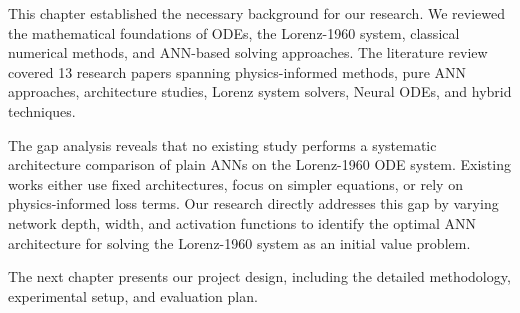 This chapter established the necessary background for our research. We reviewed the mathematical foundations of ODEs, the Lorenz-1960 system, classical numerical methods, and ANN-based solving approaches. The literature review covered 13 research papers spanning physics-informed methods, pure ANN approaches, architecture studies, Lorenz system solvers, Neural ODEs, and hybrid techniques.

The gap analysis reveals that no existing study performs a systematic architecture comparison of plain ANNs on the Lorenz-1960 ODE system. Existing works either use fixed architectures, focus on simpler equations, or rely on physics-informed loss terms. Our research directly addresses this gap by varying network depth, width, and activation functions to identify the optimal ANN architecture for solving the Lorenz-1960 system as an initial value problem.

The next chapter presents our project design, including the detailed methodology, experimental setup, and evaluation plan.
